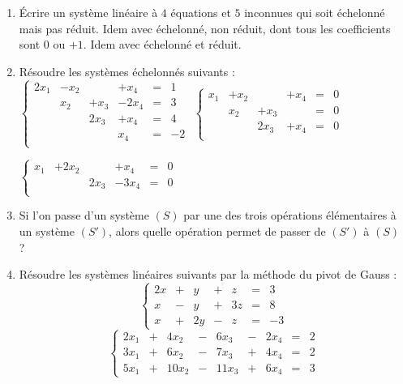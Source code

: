 \documentclass[class=report,crop=false]{standalone}
\begin{document}
\begin{miniexercices}
\sauteligne
\begin{enumerate}
  \item \'Ecrire un système linéaire à $4$ équations et $5$ inconnues qui soit
  échelonné mais pas réduit. Idem avec échelonné, non réduit, dont tous les coefficients sont
  $0$ ou $+1$. Idem avec échelonné et réduit.

  \item Résoudre les systèmes échelonnés suivants :
 $\left \{ \begin{array}{cccccc}
2x_1 & -x_2&      & +x_4 &=& 1 \\
     & x_2 & +x_3 &-2x_4 &=& 3 \\
     &     & 2x_3 & +x_4 &=& 4 \\
     &     &      & x_4  &=& -2 \\
\end{array} \right.$\qquad
 $\left \{ \begin{array}{cccccc}
x_1 & +x_2&      & +x_4 &=& 0 \\
     & x_2 & +x_3 &     &=& 0 \\
     &     & 2x_3 & +x_4 &=& 0 \\
\end{array} \right.$ 

 $\left \{ \begin{array}{cccccc}
x_1 & +2x_2&      & +x_4   &=& 0 \\
     &     & 2x_3 & -3x_4 &=& 0 \\
\end{array} \right.$

  \item Si l'on passe d'un système $(S)$ par une des trois opérations élémentaires à un système
  $(S')$, alors quelle opération permet de passer de $(S')$ à $(S)$ ?

  \item Résoudre les systèmes linéaires suivants par la méthode du pivot de Gauss :
  $$\left\{
\begin{array}{ccccccc}
2x   &+&  y    &+&   z  &=&  3 \\
x    &-&  y    &+&   3z &=&  8 \\
x    &+&  2y   &-&   z  &=&  -3
\end{array}\right.$$
$$
\left\{
\begin{array}{ccccccccc}
2x_1 & + & 4x_2 & - & 6x_3 & - & 2x_4 & = & 2\\
3x_1 & + & 6x_2 & - & 7x_3 & + & 4x_4 &= & 2\\
5x_1 & + & 10 x_2 & - & 11 x_3 & + & 6x_4 &   = & 3
\end{array}
 \right.
$$



\end{enumerate}
\end{miniexercices}
\end{document}
